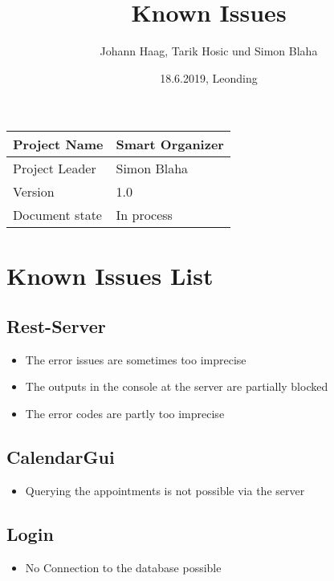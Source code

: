 \documentclass[12pt]{scrartcl}
\title{Known Issues}
\author{Johann Haag, Tarik Hosic und Simon Blaha}
\date{18.6.2019, Leonding}
\begin{document}
    \maketitle
    \begin{flushleft}
    \begin{tabular}{|l|l|}
    \hline
    Project Name & Smart Organizer \\ \hline
    Project Leader & Simon Blaha \\ \hline
    Version & 1.0\\ \hline
    Document state & In process \\ \hline
    \end{tabular}
    \end{flushleft}

    \pagebreak
    \tableofcontents
    \pagebreak

    \section{Known Issues List}
    \subsection{Rest-Server}
    \begin{itemize}
        \item The error issues are sometimes too imprecise
        \item The outputs in the console at the server are partially blocked
        \item The error codes are partly too imprecise
    \end{itemize}

    \subsection{CalendarGui}
    \begin{itemize}
        \item Querying the appointments is not possible via the server
    \end{itemize}

    \subsection{Login}
    \begin{itemize}
        \item No Connection to the database possible
    \end{itemize}
\end{document}
